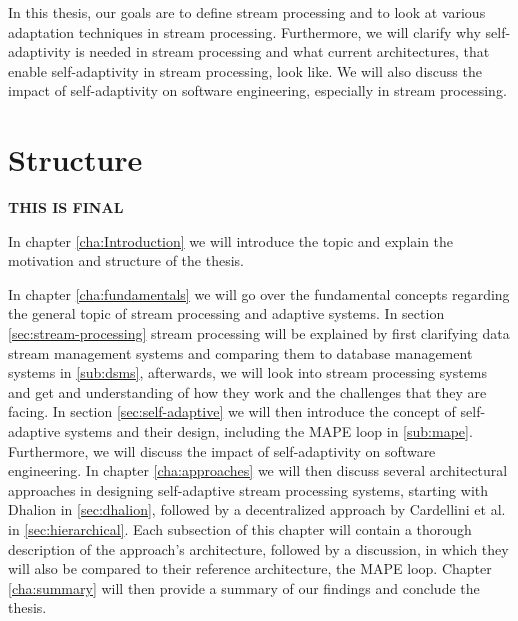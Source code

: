\quad In this thesis, our goals are to define stream processing and to look at various adaptation techniques in stream processing. Furthermore, we will clarify why
self-adaptivity is needed in stream processing and what current architectures, that enable self-adaptivity in stream processing, look like.
We will also discuss the impact of self-adaptivity on software engineering, especially in stream processing.


\section{Structure}
\label{sec:structure}
\textbf{\color{green}THIS IS FINAL}

In chapter \ref{cha:Introduction} we will introduce the topic and explain the motivation and structure of the thesis.

In chapter \ref{cha:fundamentals} we will go over the fundamental concepts regarding the general topic of stream processing and adaptive systems.
In section \ref{sec:stream-processing} stream processing will be explained by first clarifying data stream management systems and comparing them to database management systems 
in \ref{sub:dsms}, afterwards, we will look into stream processing systems and get and understanding of how they work and the challenges that they are facing.
In section \ref{sec:self-adaptive} we will then introduce the concept of self-adaptive systems and their design, including the MAPE loop in \ref{sub:mape}. 
Furthermore, we will discuss the impact of self-adaptivity on software engineering.
In chapter \ref{cha:approaches} we will then discuss several architectural approaches in designing self-adaptive stream processing systems, starting with Dhalion in \ref{sec:dhalion}, 
followed by a decentralized approach by Cardellini et al. in \ref{sec:hierarchical}.
Each subsection of this chapter will contain a thorough description of the approach's architecture, followed by a discussion, 
in which they will also be compared to their reference architecture, the MAPE loop.
Chapter \ref{cha:summary} will then provide a summary of our findings and conclude the thesis.